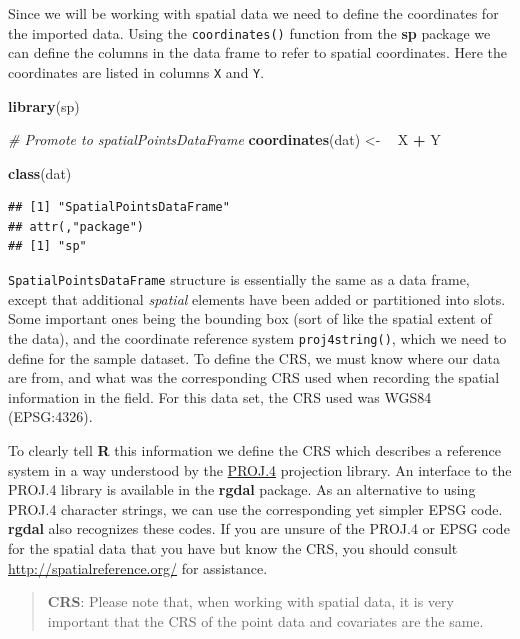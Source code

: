 \documentclass[10pt,b5paper,]{book}
\newenvironment{Shaded}{\begin{snugshade}}{\end{snugshade}}
\newcommand{\CommentTok}[1]{\textcolor[rgb]{0.56,0.35,0.01}{\textit{#1}}}
\newcommand{\ErrorTok}[1]{\textcolor[rgb]{0.64,0.00,0.00}{\textbf{#1}}}
\newcommand{\KeywordTok}[1]{\textcolor[rgb]{0.13,0.29,0.53}{\textbf{#1}}}
\newcommand{\NormalTok}[1]{#1}
\newcommand{\OperatorTok}[1]{\textcolor[rgb]{0.81,0.36,0.00}{\textbf{#1}}}
\newcommand{\StringTok}[1]{\textcolor[rgb]{0.31,0.60,0.02}{#1}}
\theoremstyle{definition}
\theoremstyle{definition}
\theoremstyle{definition}
\theoremstyle{remark}
\begin{document}
Since we will be working with spatial data we need to define the
coordinates for the imported data. Using the \texttt{coordinates()}
function from the \textbf{sp} package we can define the columns in the
data frame to refer to spatial coordinates. Here the coordinates are
listed in columns \texttt{X} and \texttt{Y}.

\begin{Shaded}
\begin{Highlighting}[]
\KeywordTok{library}\NormalTok{(sp)}

\CommentTok{# Promote to spatialPointsDataFrame}
\KeywordTok{coordinates}\NormalTok{(dat) <-}\StringTok{ }\ErrorTok{~}\StringTok{ }\NormalTok{X }\OperatorTok{+}\StringTok{ }\NormalTok{Y}

\KeywordTok{class}\NormalTok{(dat)}
\end{Highlighting}
\end{Shaded}

\begin{verbatim}
## [1] "SpatialPointsDataFrame"
## attr(,"package")
## [1] "sp"
\end{verbatim}

\texttt{SpatialPointsDataFrame} structure is essentially the same as a
data frame, except that additional \emph{spatial} elements have been
added or partitioned into slots. Some important ones being the bounding
box (sort of like the spatial extent of the data), and the coordinate
reference system \texttt{proj4string()}, which we need to define for the
sample dataset. To define the CRS, we must know where our data are from,
and what was the corresponding CRS used when recording the spatial
information in the field. For this data set, the CRS used was WGS84
(EPSG:4326).

To clearly tell \textbf{R} this information we define the CRS which
describes a reference system in a way understood by the
\href{http://trac.osgeo.org/proj/}{PROJ.4} projection library. An
interface to the PROJ.4 library is available in the \textbf{rgdal}
package. As an alternative to using PROJ.4 character strings, we can use
the corresponding yet simpler EPSG code. \textbf{rgdal} also recognizes
these codes. If you are unsure of the PROJ.4 or EPSG code for the
spatial data that you have but know the CRS, you should consult
\url{http://spatialreference.org/} for assistance.

\begin{quote}
\textbf{CRS}: Please note that, when working with spatial data, it is
very important that the CRS of the point data and covariates are the
same.
\end{quote}
\end{document}

